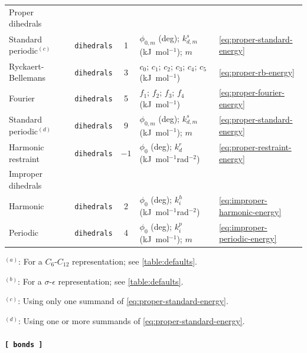 \documentclass[10pt,a4paper,openany]{memoir}
\numberwithin{equation}{section}
\begin{document}
\begin{table}[tb]
\begin{tabular}{lccp{49ex}l}
Proper dihedrals &  &  &  & \\
\hspace{1ex} Standard periodic$^{(c)}$  & \texttt{dihedrals} &  1 & \(\phi_{0,m}\) (deg); \(k_{d,m}^s\) (kJ~mol$^{-1}$); \(m\) & \autoref{eq:proper-standard-energy}\\
\hspace{1ex} Ryckaert-Bellemans & \texttt{dihedrals} &  3 & \(c_0\); \(c_1\); \(c_2\); \(c_3\); \(c_4\); \(c_5\) (kJ~mol$^{-1}$)& \autoref{eq:proper-rb-energy}\\
\hspace{1ex} Fourier & \texttt{dihedrals} &  5 & \(f_1\); \(f_2\); \(f_3\); \(f_4\) (kJ~mol$^{-1}$) & \autoref{eq:proper-fourier-energy}\\
    \hspace{1ex} Standard periodic$^{(d)}$  & \texttt{dihedrals} &  9 & \(\phi_{0,m}\) (deg); \(k_{d,m}^s\) (kJ~mol$^{-1}$); \(m\) & \autoref{eq:proper-standard-energy}\\
    \hspace{1ex} Harmonic restraint & \texttt{dihedrals} &  \(-1\) & \(\phi_{0}\) (deg); \(k_{d}^r\) (kJ~mol$^{-1}$rad$^{-2}$) & \autoref{eq:proper-restraint-energy}\\
\hline
Improper dihedrals & &  &  & \\
\hspace{1ex} Harmonic & \texttt{dihedrals} &  2 & \(\phi_{0}\) (deg); \(k_i^h\) (kJ~mol$^{-1}$rad$^{-2}$)& \autoref{eq:improper-harmonic-energy}\\
\hspace{1ex} Periodic & \texttt{dihedrals} &  4 & \(\phi_{0}\) (deg); \(k_{i}^p\) (kJ~mol$^{-1}$); \(m\) & \autoref{eq:improper-periodic-energy}\\
\bottomrule
  \end{tabular}
  \vspace{1ex}\par
  {\footnotesize $^{(a)}$: For a $C_6$-$C_{12}$ representation; see \autoref{table:defaults}. \par $^{(b)}$: For a $\sigma$-$\epsilon$ representation; see \autoref{table:defaults}. \par $^{(c)}$: Using only one summand of \autoref{eq:proper-standard-energy}. \par $^{(d)}$: Using one or more summands of \autoref{eq:proper-standard-energy}.}
\end{table}

\paragraph{\texttt{[~bonds~]}}
\end{document}
